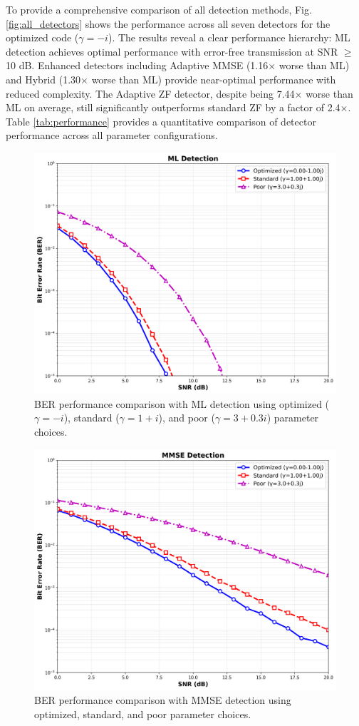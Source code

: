 To provide a comprehensive comparison of all detection methods, Fig. \ref{fig:all_detectors} shows the performance across all seven detectors for the optimized code (\(\gamma = -i\)). The results reveal a clear performance hierarchy: ML detection achieves optimal performance with error-free transmission at SNR $\geq$ 10 dB. Enhanced detectors including Adaptive MMSE (1.16$\times$ worse than ML) and Hybrid (1.30$\times$ worse than ML) provide near-optimal performance with reduced complexity. The Adaptive ZF detector, despite being 7.44$\times$ worse than ML on average, still significantly outperforms standard ZF by a factor of 2.4$\times$. Table \ref{tab:performance} provides a quantitative comparison of detector performance across all parameter configurations.

\begin{figure}[!t]
\centering
\includegraphics[width=0.9\columnwidth]{figures/ml_detection.png} 
\caption{BER performance comparison with ML detection using optimized (\(\gamma = -i\)), standard (\(\gamma = 1+i\)), and poor (\(\gamma = 3+0.3i\)) parameter choices.}
\label{fig:ml_plot}
\end{figure}

\begin{figure}[!t]
\centering
\includegraphics[width=0.9\columnwidth]{figures/mmse_detection.png} 
\caption{BER performance comparison with MMSE detection using optimized, standard, and poor parameter choices.}
\label{fig:mmse_plot}
\end{figure}

